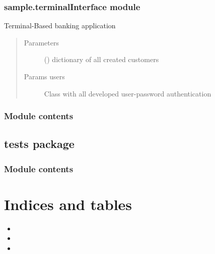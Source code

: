 \documentclass[letterpaper,10pt,english]{sphinxmanual}
\begin{document}
\subsection{sample.terminalInterface module}
\label{\detokenize{sample:module-sample.terminalInterface}}\label{\detokenize{sample:sample-terminalinterface-module}}

\begin{fulllineitems}
\label{\detokenize{sample:sample.terminalInterface.displayInterface}}
Terminal-Based banking application
\begin{quote}\begin{description}
\item[{Parameters}] \leavevmode
{} () \textendash{} dictionary of all created customers

\item[{Params users}] \leavevmode
Class with all developed user-password authentication

\end{description}\end{quote}

\end{fulllineitems}



\subsection{Module contents}
\label{\detokenize{sample:module-sample}}\label{\detokenize{sample:module-contents}}

\section{tests package}
\label{\detokenize{tests::doc}}\label{\detokenize{tests:tests-package}}

\subsection{Module contents}
\label{\detokenize{tests:module-tests}}\label{\detokenize{tests:module-contents}}

\chapter{Indices and tables}
\label{\detokenize{index:indices-and-tables}}\begin{itemize}
\item {} 

\item {} 

\item {} 

\end{itemize}
\end{document}
